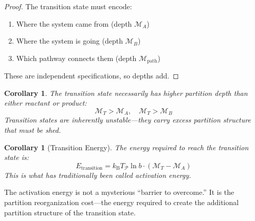 ﻿\documentclass[twocolumn,10pt,a4paper]{article}
\newtheorem{corollary}[theorem]{Corollary}
\theoremstyle{definition}
\theoremstyle{remark}
\newcommand{\kB}{k_{\mathrm{B}}}
\newcommand{\Depth}{\mathcal{M}}
\newcommand{\Part}{\mathcal{P}}
\begin{document}
\begin{proof}
The transition state must encode:
\begin{enumerate}
    \item Where the system came from (depth $\Depth_A$)
    \item Where the system is going (depth $\Depth_B$)
    \item Which pathway connects them (depth $\Depth_{\mathrm{path}}$)
\end{enumerate}
These are independent specifications, so depths add.
\end{proof}

\begin{corollary}
The transition state necessarily has higher partition depth than either reactant or product:
\begin{equation}
    \Depth_T > \Depth_A, \quad \Depth_T > \Depth_B
\end{equation}
Transition states are inherently unstable---they carry excess partition structure that must be shed.
\end{corollary}

\begin{corollary}[Transition Energy]
\label{cor:activation}
The energy required to reach the transition state is:
\begin{equation}
    E_{\mathrm{transition}} = \kB T_{\Part} \ln b \cdot (\Depth_T - \Depth_A)
\end{equation}
This is what has traditionally been called activation energy.
\end{corollary}

The activation energy is not a mysterious ``barrier to overcome.'' It is the partition reorganization cost---the energy required to create the additional partition structure of the transition state.
\end{document}
